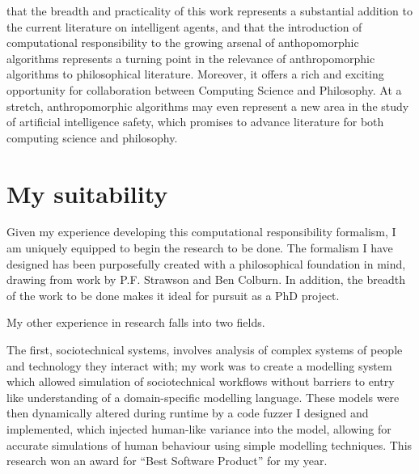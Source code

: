 \bigskip
{} that the breadth and practicality of this work represents a substantial addition to the current literature on intelligent agents, and that the introduction of computational responsibility to the growing arsenal of anthopomorphic algorithms represents a turning point in the relevance of anthropomorphic algorithms to philosophical literature. Moreover, it offers a rich and exciting opportunity for collaboration between Computing Science and Philosophy. At a stretch, anthropomorphic algorithms may even represent a new area in the study of artificial intelligence safety, which promises to advance literature for both computing science and philosophy.

\newpage
\section{My suitability}
Given my experience developing this computational responsibility formalism, I am uniquely equipped to begin the research to be done. The formalism I have designed has been purposefully created with a philosophical foundation in mind, drawing from work by P.F. Strawson\cite{freedomandresentment} and Ben Colburn. In addition, the breadth of the work to be done makes it ideal for pursuit as a PhD project.\par

\bigskip
My other experience in research falls into two fields. \par

The first, sociotechnical systems, involves analysis of complex systems of people and technology they interact with; my work was to create a modelling system which allowed simulation of sociotechnical workflows without barriers to entry like understanding of a domain-specific modelling language. These models were then dynamically altered during runtime by a code fuzzer I designed and implemented, which injected human-like variance into the model, allowing for accurate simulations of human behaviour using simple modelling techniques. This research won an award for ``Best Software Product'' for my year.\par

